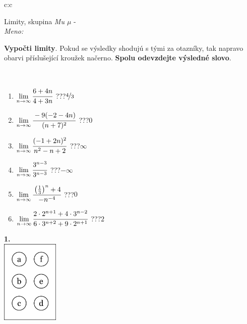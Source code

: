 \documentclass[10pt]{report}
\begin{document}
\begin{tabular}{c:c}
\begin{minipage}[c][104.5mm][t]{0.5\linewidth}
\begin{center}
\vspace{7mm}
{\huge Limity, skupina \textit{Mu $\mu$} -}\\[5mm]
\textit{Meno:}\phantom{xxxxxxxxxxxxxxxxxxxxxxxxxxxxxxxxxxxxxxxxxxxxxxxxxxxxxxxxxxxxxxxxx}\\[5mm]
\begin{minipage}{0.95\linewidth}
\begin{center}
\textbf{Vypočti limity}. Pokud se výsledky shodujú s tými za otazníky, tak napravo\\obarvi příslušející kroužek načerno. \textbf{Spolu odevzdejte výsledné slovo}.
\end{center}
\end{minipage}
\\[1mm]
\begin{minipage}{0.79\linewidth}
\begin{center}
\begin{varwidth}{\linewidth}
\begin{enumerate}
\normalsize
\item $\lim\limits_{n\to\infty}\cfrac{6+4n}{4+3n}$\quad \dotfill\; ???\;\dotfill \quad $\nicefrac{4}{3}$
\item $\lim\limits_{n\to\infty}\cfrac{-9(-2-4n)}{(n+7)^2}$\quad \dotfill\; ???\;\dotfill \quad $0$
\item $\lim\limits_{n\to\infty}\cfrac{(-1+2n)^2}{n^2-n+2}$\quad \dotfill\; ???\;\dotfill \quad $\infty$
\item $\lim\limits_{n\to\infty}\cfrac{3^{n-3}}{3^{n-3}}$\quad \dotfill\; ???\;\dotfill \quad $-\infty$
\item $\lim\limits_{n\to\infty}\cfrac{\left(\frac{1}{3}\right)^n +4}{-n^{-4}}$\quad \dotfill\; ???\;\dotfill \quad $0$
\item $\lim\limits_{n\to\infty}\cfrac{2\cdot 2^{n+1}+4\cdot 3^{n-2}}{6\cdot 3^{n+2}+9\cdot 2^{n+1}}$\quad \dotfill\; ???\;\dotfill \quad $2$
\end{enumerate}
\end{varwidth}
\end{center}
\end{minipage}
\begin{minipage}{0.20\linewidth}
\begin{center}
{\Huge\bfseries 1.} \\[2mm]
\includegraphics[height=40mm]{../images/braille.png}

\end{center}
\end{minipage}
\end{center}
\end{minipage}
\end{tabular}
\end{document}
